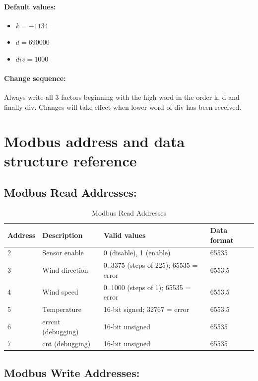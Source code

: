 \paragraph{Default values:}
\begin{itemize}
\item $k = -1134  $
\item $d = 690000 $
\item $div = 1000 $
\end{itemize}

\paragraph{Change sequence: }Always write all 3 factors beginning with the high word in the order k, d and finally div. Changes will take effect when lower word of div has been received.

\section{Modbus address and data structure reference}
\label{sec:modbus_address_ref}
\subsection{Modbus Read Addresses:}

\begin{table}[h]
    \centering
    \begin{tabular}{|l|l|l|l|}
    \hline \textbf{Address} & \textbf{Description} & \textbf{Valid values} & \textbf{Data format} \\ 
    \hline
    \hline 2 & Sensor enable & 0 (disable), 1 (enable) & 65535 \\ 
    \hline 3 & Wind direction & 0..3375 (steps of 225); 65535 = error & 6553.5 \\ 
    \hline 4 & Wind speed & 0..1000 (steps of 1); 65535 = error & 6553.5 \\ 
    \hline 5 & Temperature & 16-bit signed; 32767 = error & 6553.5 \\ 
    \hline 6 & errcnt (debugging) & 16-bit unsigned & 65535 \\ 
    \hline 7 & cnt (debugging) & 16-bit unsigned & 65535 \\ 
    \hline 
    \end{tabular}
    \caption{Modbus Read Addresses}
\end{table}


\subsection{Modbus Write Addresses:}

